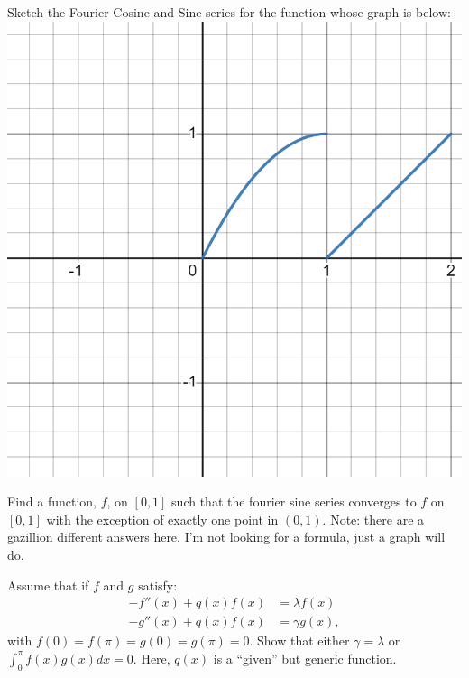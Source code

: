 \documentclass[12pt]{exam}
\begin{document}
\newpage 
\begin{questions}
\begin{question}
Sketch the Fourier Cosine and Sine series for the function whose graph is below: 
\includegraphics[width=.9\linewidth]{graph11.png}
\end{question}
\newpage 
\begin{solutionorbox}[\stretch{1}]
\end{solutionorbox}

\newpage 
\begin{question}
Find a function, $f$, on $[0, 1]$ such that the fourier sine series converges
to $f$ on $[0,1]$ with the exception of exactly one point in $(0,1)$. Note: there 
are a gazillion different answers here. I'm not looking for a formula, just a 
graph will do. 
\end{question}
\begin{solutionorbox}[\stretch{1}]
\end{solutionorbox}


\newpage 
\begin{question}
Assume that if $f$ and $g$ satisfy: 
\begin{align*}
-f''(x) + q(x)f(x) &= \lambda f(x)\\ 
-g''(x) + q(x)f(x) &= \gamma g(x),
\end{align*}
with $f(0) = f(\pi) = g(0) = g(\pi) = 0$. Show that either 
$\gamma = \lambda$ or $\int_{0}^{\pi} f(x)g(x)dx = 0$. Here, $q(x)$ is a 
``given'' but generic function. 
\end{question}
\begin{solutionorbox}[\stretch{1}]
\end{solutionorbox}



\end{questions}
\end{document}
